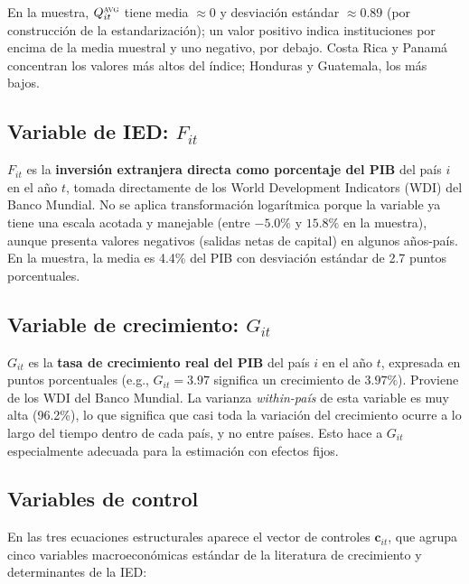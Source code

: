 \documentclass[12pt, a4paper]{article}
\theoremstyle{definition}
\begin{document}
En la muestra, $Q^{\textsc{avg}}_{it}$ tiene media $\approx 0$ y desviación estándar $\approx 0.89$ (por construcción de la estandarización); un valor positivo indica instituciones por encima de la media muestral y uno negativo, por debajo. Costa Rica y Panamá concentran los valores más altos del índice; Honduras y Guatemala, los más bajos.

\subsection{Variable de IED: $F_{it}$}

$F_{it}$ es la \textbf{inversión extranjera directa como porcentaje del PIB} del país $i$ en el año $t$, tomada directamente de los World Development Indicators (WDI) del Banco Mundial. No se aplica transformación logarítmica porque la variable ya tiene una escala acotada y manejable (entre $-5.0\%$ y $15.8\%$ en la muestra), aunque presenta valores negativos (salidas netas de capital) en algunos años-país. En la muestra, la media es 4.4\% del PIB con desviación estándar de 2.7 puntos porcentuales.

\subsection{Variable de crecimiento: $G_{it}$}

$G_{it}$ es la \textbf{tasa de crecimiento real del PIB} del país $i$ en el año $t$, expresada en puntos porcentuales (e.g., $G_{it} = 3.97$ significa un crecimiento de $3.97\%$). Proviene de los WDI del Banco Mundial. La varianza \emph{within-país} de esta variable es muy alta (96.2\%), lo que significa que casi toda la variación del crecimiento ocurre a lo largo del tiempo dentro de cada país, y no entre países. Esto hace a $G_{it}$ especialmente adecuada para la estimación con efectos fijos.

\subsection{Variables de control}

En las tres ecuaciones estructurales aparece el vector de controles $\bm{c}_{it}$, que agrupa cinco variables macroeconómicas estándar de la literatura de crecimiento y determinantes de la IED:
\end{document}
